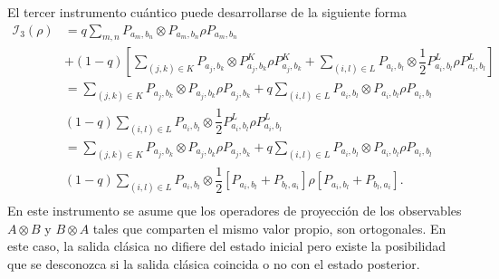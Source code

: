 
El tercer instrumento cuántico puede desarrollarse de la siguiente forma
\begin{equation}\label{eq:quantum-instrument-3-desarrollo}
    \begin{split}
        \mathcal{I}_3(\rho)&=q\sum_{m,n}  P_{a_m,b_n}\otimes P_{a_m,b_n}\rho P_{a_m,b_n}\\
        &+(1-q)\left[\sum_{(j,k)\in K}P_{a_j,b_k} \otimes P^{K}_{a_j,b_k}\rho P^{K}_{a_j,b_k}+\sum_{(i,l) \in L}P_{a_i,b_l} \otimes  \dfrac{1}{2}P^{L}_{a_i,b_l}\rho P^L_{a_i,b_l}\right]\\
        &=\sum_{(j,k)\in K}  P_{a_j,b_k}\otimes P_{a_j,b_k}\rho P_{a_j,b_k}+q\sum_{(i,l)\in L}P_{a_i,b_l} \otimes P_{a_i,b_l}\rho P_{a_i,b_l}\\
        &(1-q)\sum_{(i,l) \in L}P_{a_i,b_l} \otimes  \dfrac{1}{2}P^{L}_{a_i,b_l}\rho P^L_{a_i,b_l}\\
        &=\sum_{(j,k)\in K}  P_{a_j,b_k}\otimes P_{a_j,b_k}\rho P_{a_j,b_k}+q\sum_{(i,l)\in L}P_{a_i,b_l} \otimes P_{a_i,b_l}\rho P_{a_i,b_l}\\
        &(1-q)\sum_{(i,l) \in L}P_{a_i,b_l} \otimes  \dfrac{1}{2}\left[P_{a_i,b_l}+P_{b_l,a_i}\right]\rho \left[P_{a_i,b_l}+P_{b_l,a_i}\right].\\
    \end{split}
\end{equation}En este instrumento se asume que los operadores de proyección de los observables $A\otimes B$ y $B\otimes A$ tales que comparten el mismo valor propio, son ortogonales. En este caso, la salida clásica no difiere del estado inicial pero existe la posibilidad que se desconozca si la salida clásica coincida o no  con el estado posterior. 

